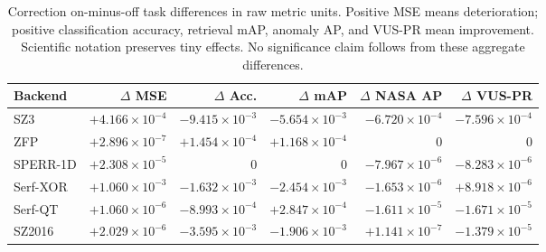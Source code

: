 \begin{table}[t]
\centering
\small
\setlength{\tabcolsep}{5pt}
\caption{Correction on-minus-off task differences in raw metric units. Positive MSE means deterioration; positive classification accuracy, retrieval mAP, anomaly AP, and VUS-PR mean improvement. Scientific notation preserves tiny effects. No significance claim follows from these aggregate differences.}
\label{tab:s-ablation-correction-quality}
\begin{tabular}{@{}lrrrrr@{}}
\toprule
Backend & $\Delta$ MSE & $\Delta$ Acc. & $\Delta$ mAP & $\Delta$ NASA AP & $\Delta$ VUS-PR \\
\midrule
SZ3 & $+4.166\!\times\!10^{-4}$ & $-9.415\!\times\!10^{-3}$ & $-5.654\!\times\!10^{-3}$ & $-6.720\!\times\!10^{-4}$ & $-7.596\!\times\!10^{-4}$ \\
ZFP & $+2.896\!\times\!10^{-7}$ & $+1.454\!\times\!10^{-4}$ & $+1.168\!\times\!10^{-4}$ & $0$ & $0$ \\
SPERR-1D & $+2.308\!\times\!10^{-5}$ & $0$ & $0$ & $-7.967\!\times\!10^{-6}$ & $-8.283\!\times\!10^{-6}$ \\
Serf-XOR & $+1.060\!\times\!10^{-3}$ & $-1.632\!\times\!10^{-3}$ & $-2.454\!\times\!10^{-3}$ & $-1.653\!\times\!10^{-6}$ & $+8.918\!\times\!10^{-6}$ \\
Serf-QT & $+1.060\!\times\!10^{-6}$ & $-8.993\!\times\!10^{-4}$ & $+2.847\!\times\!10^{-4}$ & $-1.611\!\times\!10^{-5}$ & $-1.671\!\times\!10^{-5}$ \\
SZ2016 & $+2.029\!\times\!10^{-6}$ & $-3.595\!\times\!10^{-3}$ & $-1.906\!\times\!10^{-3}$ & $+1.141\!\times\!10^{-7}$ & $-1.379\!\times\!10^{-5}$ \\
\bottomrule
\end{tabular}
\end{table}

